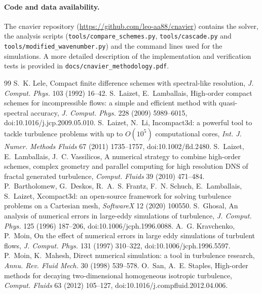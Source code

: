 \documentclass[11pt,a4paper]{article}
\newcommand{\code}[1]{\texttt{#1}}
\begin{document}
\paragraph{Code and data availability.}
\begin{sloppypar}
The cnavier repository (\url{https://github.com/leo-aa88/cnavier}) contains the solver, the analysis scripts (\code{tools/compare\_schemes.py}, \code{tools/cascade.py} and \code{tools/modified\_wavenumber.py}) and the command lines used for the simulations. A more detailed description of the implementation and verification tests is provided in \code{docs/cnavier\_methodology.pdf}.
\end{sloppypar}
\begin{thebibliography}{99}
S.~K. Lele, Compact finite difference schemes with spectral-like resolution, \emph{J. Comput. Phys.} 103 (1992) 16--42.
S.~Laizet, E.~Lamballais, High-order compact schemes for incompressible flows: a simple and efficient method with quasi-spectral accuracy, \emph{J. Comput. Phys.} 228 (2009) 5989--6015, doi:10.1016/j.jcp.2009.05.010.
S.~Laizet, N.~Li, Incompact3d: a powerful tool to tackle turbulence problems with up to $O(10^5)$ computational cores, \emph{Int. J. Numer. Methods Fluids} 67 (2011) 1735--1757, doi:10.1002/fld.2480.
S.~Laizet, E.~Lamballais, J.~C. Vassilicos, A numerical strategy to combine high-order schemes, complex geometry and parallel computing for high resolution DNS of fractal generated turbulence, \emph{Comput. Fluids} 39 (2010) 471--484.
P.~Bartholomew, G.~Deskos, R.~A.~S. Frantz, F.~N. Schuch, E.~Lamballais, S.~Laizet, Xcompact3d: an open-source framework for solving turbulence problems on a Cartesian mesh, \emph{SoftwareX} 12 (2020) 100550.
S.~Ghosal, An analysis of numerical errors in large-eddy simulations of turbulence, \emph{J. Comput. Phys.} 125 (1996) 187--206, doi:10.1006/jcph.1996.0088.
A.~G. Kravchenko, P.~Moin, On the effect of numerical errors in large eddy simulations of turbulent flows, \emph{J. Comput. Phys.} 131 (1997) 310--322, doi:10.1006/jcph.1996.5597.
P.~Moin, K.~Mahesh, Direct numerical simulation: a tool in turbulence research, \emph{Annu. Rev. Fluid Mech.} 30 (1998) 539--578.
O.~San, A.~E. Staples, High-order methods for decaying two-dimensional homogeneous isotropic turbulence, \emph{Comput. Fluids} 63 (2012) 105--127, doi:10.1016/j.compfluid.2012.04.006.

\end{thebibliography}
\end{document}
